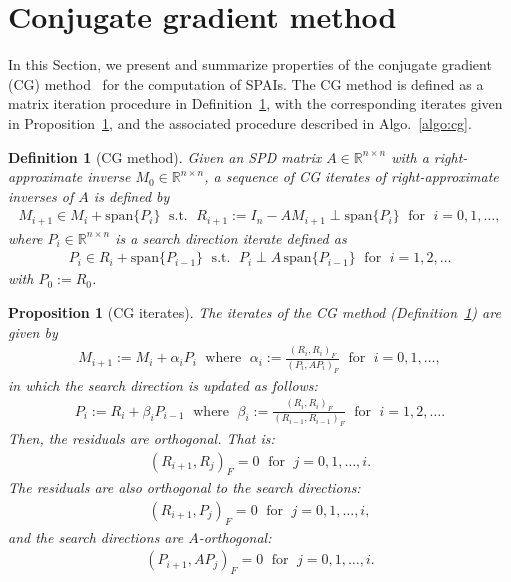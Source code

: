 \documentclass[numbers,webpdf,imanum]{ima-authoring-template}%
\theoremstyle{thmstyletwo}%
\newtheorem{proposition}[theorem]{Proposition}%
\newtheorem{definition}{Definition}
\numberwithin{equation}{section}
\begin{document}
\section{Conjugate gradient method}\label{sec:cg}
In this Section, we present and summarize properties of the conjugate gradient (CG) method~\cite{hestenes_methods_1952} for the computation of SPAIs.
The CG method is defined as a matrix iteration procedure in Definition~\ref{def:cg}, with the corresponding iterates given in Proposition~\ref{prop:cg-iterates}, and the associated procedure described in Algo.~\ref{algo:cg}.

\begin{definition}[CG method]\label{def:cg}
Given an SPD matrix $A\in\mathbb{R}^{n\times n}$ with a right-approximate inverse $M_0\in\mathbb{R}^{n\times n}$, a sequence of CG iterates of right-approximate inverses of $A$ is defined by
\begin{align}\label{eq:700}
M_{i+1}\in M_{i}+\text{span}\{P_i\}
\;\text{ s.t. }\;
R_{i+1}:=I_n-AM_{i+1}\perp\text{span}\{P_i\}
\;\text{ for }\;
i=0,1,\dots,
\end{align}
where $P_i\in\mathbb{R}^{n\times n}$ is a search direction iterate defined as
\begin{align}\label{eq:705}
P_{i}\in R_i+\text{span}\{P_{i-1}\}
\;\text{ s.t. }\;
P_{i}\perp A\,\text{span}\{P_{i-1}\}
\;\text{ for }\;
i=1,2,\dots
\end{align}
with $P_0:=R_0$.
\end{definition}

\begin{proposition}[CG iterates]\label{prop:cg-iterates}
The iterates of the CG method (Definition~\ref{def:cg}) are given by
\begin{align}\label{eq:710}
M_{i+1}:=M_{i}+\alpha_iP_i
\;\text{ where }\;
\alpha_i
:=\frac{(R_i,R_i)_F}{(P_i,AP_i)_F}
\;\text{ for }\;
i=0,1,\dots,
\end{align}
in which the search direction is updated as follows:
\begin{align}\label{eq:715}
P_{i}:=R_i+\beta_iP_{i-1}
\;\text{ where }\;
\beta_i:=\frac{(R_{i},R_{i})_F}{(R_{i-1},R_{i-1})_F}
\;\text{ for }\;
i=1,2,\dots.
\end{align}
Then, the residuals are orthogonal.
That is:
\begin{align}\label{eq:720}
(R_{i+1},R_j)_F=0
\;\text{ for }\;
j=0,1,\dots,i.
\end{align}
The residuals are also orthogonal to the search directions:
\begin{align}\label{eq:725}
(R_{i+1},P_j)_F=0
\;\text{ for }\;
j=0,1,\dots,i,
\end{align}
and the search directions are $A$-orthogonal:
\begin{align}\label{eq:730}
(P_{i+1},AP_j)_F=0
\;\text{ for }\;
j=0,1,\dots,i.
\end{align}
\end{proposition}
\end{document}
